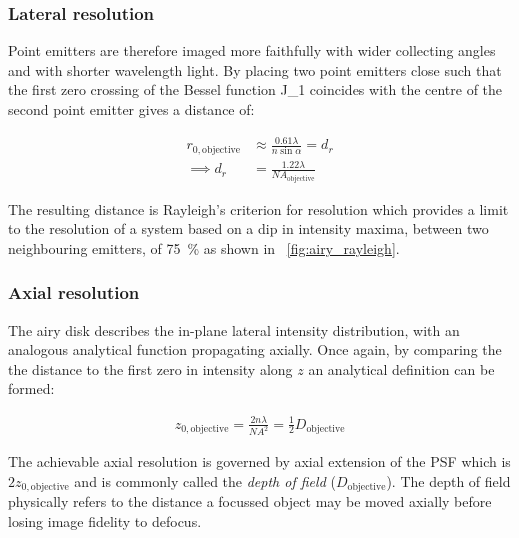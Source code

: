 \subsubsection{Lateral resolution}

Point emitters are therefore imaged more faithfully with wider collecting angles and with shorter wavelength light.
By placing two point emitters close such that the first zero crossing of the Bessel function \gls{J_1} coincides with the centre of the second point emitter gives a distance of:

\begin{align}
    r_{0,\text{objective}} &\approx \frac{0.61\lambda}{n\sin\alpha} = d_r \label{eq:lateral_res}\\
    \implies d_r &= \frac{1.22 \lambda}{NA_{\text{objective}}}
\end{align}

The resulting distance is Rayleigh's criterion for resolution which provides a limit to the resolution of a system based on a dip in intensity maxima, between two neighbouring emitters, of \SI{75}{\percent} as shown in \figurename~\ref{fig:airy_rayleigh}.

\subsubsection{Axial resolution}

The \Gls{airy disk} describes the in-plane lateral intensity distribution, with an analogous analytical function propagating axially.
Once again, by comparing the the distance to the first zero in intensity along \(z\) an analytical definition can be formed:

\begin{align}
    z_{0,\text{objective}} = \frac{2n\lambda}{{NA}^2} \label{eq:axial_res} = \frac{1}{2} D_{\text{objective}}
\end{align}

The achievable axial resolution is governed by axial extension of the \gls{PSF} which is \(2z_{0,\text{objective}}\) and is commonly called the \emph{\gls{depth of field}} (\(D_{\text{objective}}\)).
The \gls{depth of field} physically refers to the distance a focussed object may be moved axially before losing image fidelity to defocus.

